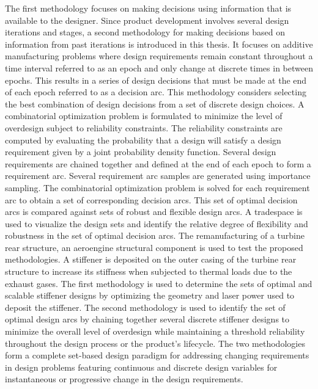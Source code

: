 \documentclass[12pt,Bold,letterpaper,TexShade,twoside]{mcgilletdclass}
\begin{document}
\begin{romanPagenumber}{2}
{The first methodology focuses on making decisions using information that is available to the designer. Since product development involves several design iterations and stages, a second methodology for making decisions based on information from past iterations is introduced in this thesis. It focuses on additive manufacturing problems where design requirements remain constant throughout a time interval referred to as an epoch and only change at discrete times in between epochs. This results in a series of design decisions that must be made at the end of each epoch referred to as a decision arc. This methodology considers selecting the best combination of design decisions from a set of discrete design choices. A combinatorial optimization problem is formulated to minimize the level of overdesign subject to reliability constraints. The reliability constraints are computed by evaluating the probability that a design will satisfy a design requirement given by a joint probability density function. Several design requirements are chained together and defined at the end of each epoch to form a requirement arc. Several requirement arc samples are generated using importance sampling. The combinatorial optimization problem is solved for each requirement arc to obtain a set of corresponding decision arcs. This set of optimal decision arcs is compared against sets of robust and flexible design arcs. A tradespace is used to visualize the design sets and identify the relative degree of flexibility and robustness in the set of optimal decision arcs.
The remanufacturing of a turbine rear structure, an aeroengine structural component is used to test the proposed methodologies. A stiffener is deposited on the outer casing of the turbine rear structure to increase its stiffness when subjected to thermal loads due to the exhaust gases. The first methodology is used to determine the sets of optimal and scalable stiffener designs by optimizing the geometry and laser power used to deposit the stiffener. The second methodology is used to identify the set of optimal design arcs by chaining together several discrete stiffener designs to minimize the overall level of overdesign while maintaining a threshold reliability throughout the design process or the product’s lifecycle.
The two methodologies form a complete set-based design paradigm for addressing changing requirements in design problems featuring continuous and discrete design variables for instantaneous or progressive change in the design requirements.}
\AbstractEn%


\end{romanPagenumber}
\end{document}

